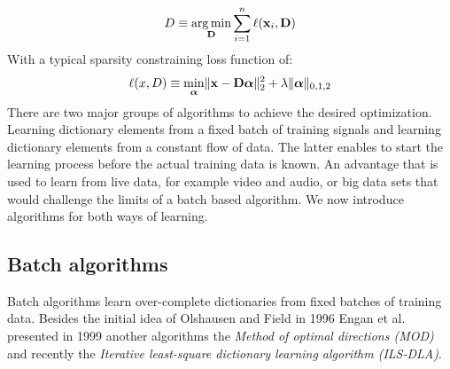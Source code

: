 \begin{equation*}
D \equiv \operatorname*{arg\,min}_{\boldsymbol{\mathrm{D}}} \sum_{i=1}^n \ell(\boldsymbol{\mathrm{x}}_i,\boldsymbol{\mathrm{D}})
\end{equation*}
With a typical sparsity constraining loss function of:
\begin{equation*}
\ell(x,D) \equiv \min_{\boldsymbol{\mathrm{\alpha}}} \lVert \boldsymbol{\mathrm{x}} - \boldsymbol{\mathrm{D}}\boldsymbol{\mathrm{\alpha}}
\rVert^{2}_{2}  +  \lambda \lVert
\boldsymbol{\mathrm{\alpha}}
\rVert_{0,1,2} 
\end{equation*}
There are two major groups of algorithms to achieve the desired optimization.
Learning dictionary elements from a fixed batch of training
signals and learning dictionary elements from a constant flow of data. The
latter enables to start the learning process before the actual training data is
known. An advantage that is used to learn from live data, for example video and
audio, or big data sets that would challenge the limits of a batch based
algorithm. We now introduce algorithms for both ways of learning.

\subsection{Batch algorithms}
Batch algorithms learn over-complete dictionaries from fixed batches of
training data. Besides the initial idea of Olshausen and Field in
1996\cite{Olshausen1996} Engan et al.\cite{Engan1999a} presented 
in 1999 another algorithms the \emph{Method of optimal directions
(MOD)} and recently the \emph{Iterative least-square dictionary learning
algorithm (ILS-DLA)}\cite{Engan2007}. 


